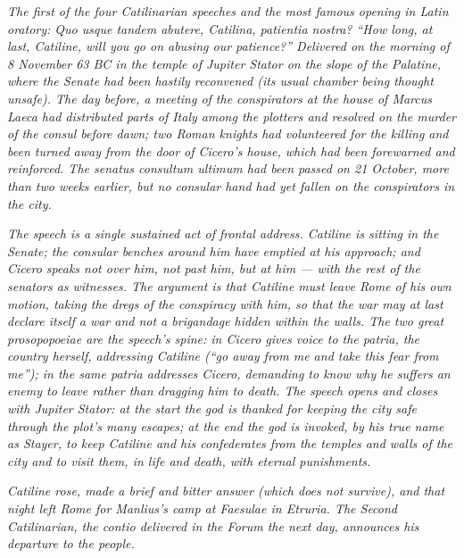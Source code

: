 
\textit{The first of the four Catilinarian speeches and the
most famous opening in Latin oratory: \textit{Quo usque
tandem abutere, Catilina, patientia nostra?} ``How long, at
last, Catiline, will you go on abusing our patience?''
Delivered on the morning of 8 November 63 BC in the temple of
Jupiter Stator on the slope of the Palatine, where the Senate
had been hastily reconvened (its usual chamber being thought
unsafe). The day before, a meeting of the conspirators at the
house of Marcus Laeca had distributed parts of Italy among the
plotters and resolved on the murder of the consul before
dawn; two Roman knights had volunteered for the killing and
been turned away from the door of Cicero's house, which had
been forewarned and reinforced. The senatus consultum
ultimum had been passed on 21 October, more than two weeks
earlier, but no consular hand had yet fallen on the
conspirators in the city.}

\textit{The speech is a single sustained act of frontal
address. Catiline is sitting in the Senate; the consular
benches around him have emptied at his approach; and Cicero
speaks not over him, not past him, but at him --- with the
rest of the senators as witnesses. The argument is that
Catiline must leave Rome of his own motion, taking the dregs
of the conspiracy with him, so that the war may at last
declare itself a war and not a brigandage hidden within the
walls. The two great prosopopoeiae are the speech's spine: in
 Cicero gives voice to the \textit{patria},
the country herself, addressing Catiline (``go away from me
and take this fear from me''); in  the same
\textit{patria} addresses Cicero, demanding to know why he
suffers an enemy to leave rather than dragging him to death.
The speech opens and closes with Jupiter Stator: at the start
the god is thanked for keeping the city safe through the
plot's many escapes; at the end the god is invoked, by his
true name as Stayer, to keep Catiline and his confederates
from the temples and walls of the city and to visit them, in
life and death, with eternal punishments.}

\textit{Catiline rose, made a brief and bitter answer (which
does not survive), and that night left Rome for Manlius's
camp at Faesulae in Etruria. The Second Catilinarian, the
\textit{contio} delivered in the Forum the next day,
announces his departure to the people.}
